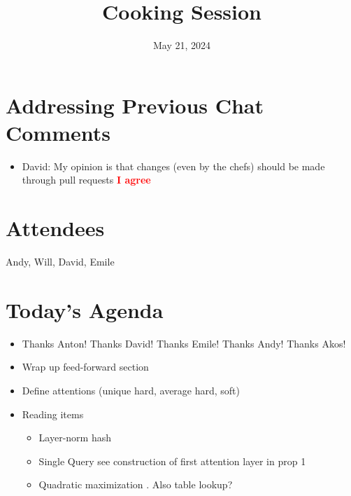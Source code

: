 \documentclass{article}
\title{Cooking Session}
\date{May 21, 2024}
\newcommand{\response}[1]{{\textcolor{red}{\textbf{#1}}}}
\begin{document}
\maketitle
\section{Addressing Previous Chat Comments}
\begin{itemize}
   \item David: My opinion is that changes (even by the chefs) should be made through pull requests \response{I agree}
\end{itemize}

\section{Attendees}

Andy, Will, David, Emile

\section{Today's Agenda}
\begin{itemize}
    \item Thanks Anton! Thanks David! Thanks Emile! Thanks Andy! Thanks Akos! 
    \item Wrap up feed-forward section
    \item Define attentions (unique hard, average hard, soft)
    \item Reading items
        \begin{itemize}
            \item Layer-norm hash \cite[\S3.2]{merrill-sabharwal-2024-cot} 
            \item Single Query \cite[\S3.2]{chiang-cholak-2022-parity} see construction of first attention layer in prop 1
            \item Quadratic maximization \cite{barcelo-etal-2024-logical}. Also table lookup?
        \end{itemize}
\end{itemize}
\end{document}
